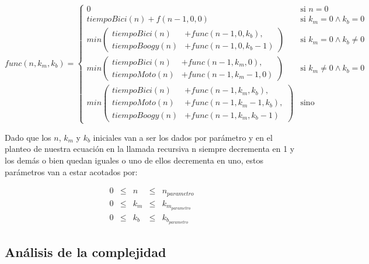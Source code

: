 \begin{equation*}
func(n, k_m, k_b) = 
\begin{cases} 
       0  & \mbox{si } n = 0  \\[2ex]
       tiempoBici(n) + f(n-1, 0, 0)  & \mbox{si } k_m=0 \wedge k_b=0 \\[2ex]
      min \left(
      \begin{split}
       tiempoBici(n) & + func(n-1, 0, k_b) , \\
       tiempoBoogy(n) & + func(n-1, 0, k_b-1)
\end{split} \right) & \mbox{si } k_m=0 \wedge k_b\neq0 \\[3ex]
      min \left(
      \begin{split}
       tiempoBici(n) & + func(n-1, k_m, 0) , \\
       tiempoMoto(n) & + func(n-1, k_m-1, 0)
\end{split} \right) & \mbox{si } k_m\neq0 \wedge k_b=0 \\[3ex]
           min \left(
      \begin{split}
       tiempoBici(n) & + func(n-1, k_m, k_b) , \\
       tiempoMoto(n) & + func(n-1, k_m-1, k_b) , \\
       tiempoBoogy(n) & + func(n-1, k_m, k_b-1)
\end{split} \right) & \mbox{sino}
\end{cases} 
\end{equation*}

Dado que los $n$, $k_m$ y $k_b$ iniciales van a ser los dados por par\'ametro y en el planteo de nuestra ecuaci\'on en la llamada recursiva n siempre decrementa en 1 y los dem\'as o bien quedan iguales o uno de ellos decrementa en uno, estos par\'ametros van a estar acotados por:

\begin{equation*}
\begin{array}{lllll}
0 & \leq & n &\leq & n_{parametro} \\
0 & \leq & k_m & \leq & k_{m_{parametro}} \\
0 & \leq & k_b & \leq & k_{b_{parametro}}
\end{array}
\end{equation*}


 



\newpage
\subsection{An\'alisis de la complejidad}
